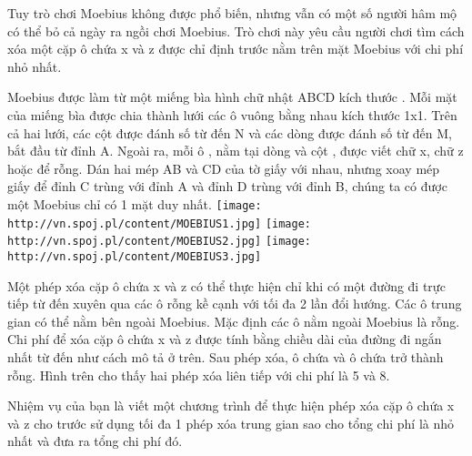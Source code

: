 Tuy trò chơi Moebius không được phổ biến, nhưng vẫn có một số người hâm mộ có thể bỏ cả ngày ra ngồi chơi Moebius. Trò chơi này yêu cầu người chơi tìm cách xóa một cặp ô chứa x và z được chỉ định trước nằm trên mặt Moebius với chi phí nhỏ nhất.  

   Moebius được làm từ một miếng bìa hình chữ nhật ABCD kích thước  . Mỗi mặt của miếng bìa được chia thành lưới các ô vuông bằng nhau kích thước 1x1. Trên cả hai lưới, các cột được đánh số từ   đến N và các dòng được đánh số từ   đến M, bắt đầu từ đỉnh A. Ngoài ra, mỗi ô  , nằm tại dòng   và cột  , được viết chữ x, chữ z hoặc để rỗng. Dán hai mép AB và CD của tờ giấy với nhau, nhưng xoay mép giấy để đỉnh C trùng với đỉnh A và đỉnh D trùng với đỉnh B, chúng ta có được một Moebius chỉ có 1 mặt duy nhất.  
\texttt{[image: http://vn.spoj.pl/content/MOEBIUS1.jpg]}
\texttt{[image: http://vn.spoj.pl/content/MOEBIUS2.jpg]}
\texttt{[image: http://vn.spoj.pl/content/MOEBIUS3.jpg]}

   Một phép xóa cặp ô chứa x và z có thể thực hiện chỉ khi có một đường đi trực tiếp từ   đến   xuyên qua các ô rỗng kề cạnh với tối đa 2 lần đổi hướng. Các ô trung gian có thể nằm bên ngoài Moebius. Mặc định các ô nằm ngoài Moebius là rỗng. Chi phí để xóa cặp ô chứa x và z được tính bằng chiều dài của đường đi ngắn nhất từ   đến   như cách mô tả ở trên. Sau phép xóa, ô chứa   và ô chứa   trở thành rỗng. Hình trên cho thấy hai phép xóa liên tiếp với chi phí là 5 và 8.  

   Nhiệm vụ của bạn là viết một chương trình để thực hiện phép xóa cặp ô chứa x và z cho trước sử dụng tối đa 1 phép xóa trung gian sao cho tổng chi phí là nhỏ nhất và đưa ra tổng chi phí đó.  

\